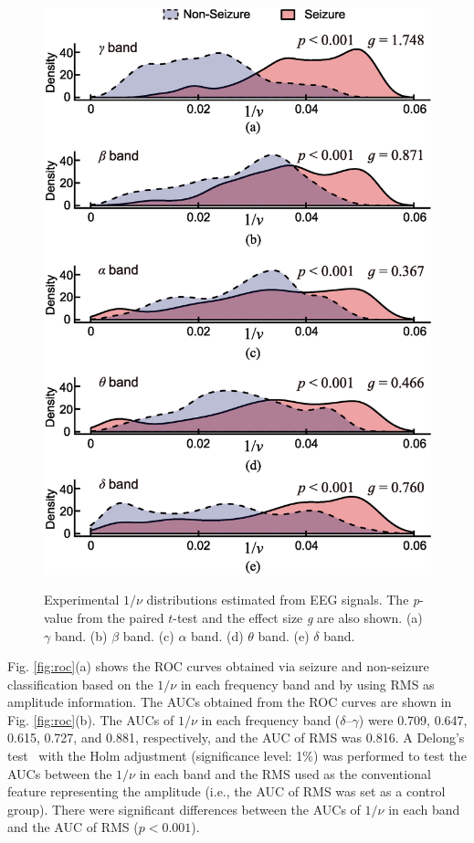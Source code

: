 \documentclass[journal]{IEEEtran}
\begin{document}
\begin{figure}[!t]　%
\centering
\includegraphics[width=1.0\hsize]{figure/dens_test_20_ver4.eps}
\caption{Experimental $1/\nu$ distributions estimated from EEG signals. The \textit{p}-value from the paired $t$-test and the effect size \textit{g} are also shown. (a) $\gamma$ band. (b) $\beta$ band. (c) $\alpha$ band. (d) $\theta$ band. (e) $\delta$ band.}
\label{fig:dens}
\end{figure}

Fig. \ref{fig:roc}(a) shows the ROC curves obtained via seizure and non-seizure classification based on the $1/\nu$ in each frequency band and by using RMS as amplitude information.
The AUCs obtained from the ROC curves are shown in Fig. \ref{fig:roc}(b).
The AUCs of $1/\nu$ in each frequency band ($\delta$--$\gamma$) were 0.709, 0.647, 0.615, 0.727, and 0.881, respectively, and the AUC of RMS was 0.816.
A Delong's test~\cite{Delong1988} with the Holm adjustment (significance level: 1\%) was performed to test the AUCs between the $1/\nu$ in each band and the RMS used as the conventional feature representing the amplitude (i.e., the AUC of RMS was set as a control group).
There were significant differences between the AUCs of $1/\nu$ in each band and the AUC of RMS ($p < 0.001$).
\end{document}
